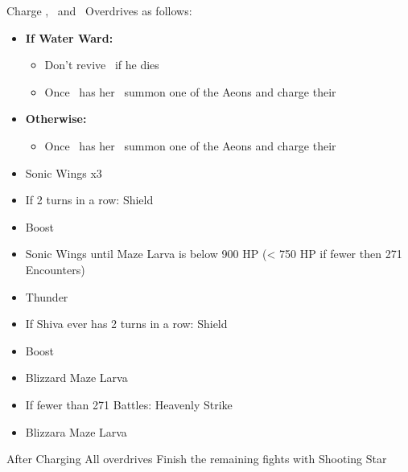 \begin{encounters}
	Charge \yuna , \valefor\ and \shiva\ Overdrives as follows:
	\vspace{\baselineskip}
	\begin{itemize}
		\yunaf
		\begin{itemize}
			\item \textbf{If Water Ward:}
				\begin{itemize}
					\yunaf Hi-Potion Self if damaged, otherwise defend
					\auronf Defend Always
					\item Don't revive \auron\ if he dies
					\item Once \yuna\ has her \od\ summon one of the Aeons and charge their \od\
				\end{itemize}
			\item \textbf{Otherwise:}
				\begin{itemize}
					\yunaf Defend
					\auronf Phoenix Down \yuna, or Hi-Potion Self
					\item Once \yuna\ has her \od\ summon one of the Aeons and charge their \od\
				\end{itemize}
		\end{itemize}
		\valeforf
		\begin{itemize}
			\item Sonic Wings x3
			\item If 2 turns in a row: Shield
			\item Boost
			\item Sonic Wings until Maze Larva is below 900 HP (< 750 HP if fewer then 271 Encounters)
			\item Thunder
		\end{itemize}
		\shivaf
		\begin{itemize}
			\item If Shiva ever has 2 turns in a row: Shield
			\item Boost
			\item Blizzard Maze Larva
			\item If fewer than 271 Battles: Heavenly Strike
			\item Blizzara Maze Larva
		\end{itemize}
	\end{itemize}
	\vspace{\baselineskip}
	After Charging All overdrives Finish the remaining fights with Shooting Star
\end{encounters}
